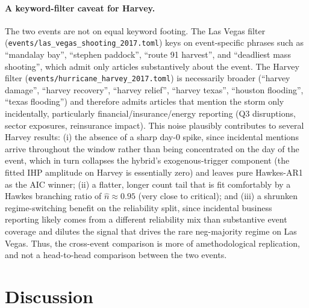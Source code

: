 \documentclass[11pt]{article}
\begin{document}
\paragraph{A keyword-filter caveat for Harvey.}
\sloppy
The two events are not on equal keyword footing. The Las Vegas filter
(\texttt{events/\allowbreak las\_vegas\_\allowbreak shooting\_2017.toml}) keys on event-specific
phrases such as ``mandalay bay'', ``stephen paddock'', ``route 91 harvest'',
and ``deadliest mass shooting'', which admit only articles substantively
about the event. The Harvey filter
(\texttt{events/\allowbreak hurricane\_\allowbreak harvey\_2017.toml}) is necessarily broader
(``harvey damage'', ``harvey recovery'', ``harvey relief'', ``harvey
texas'', ``houston flooding'', ``texas flooding'') and therefore admits
articles that mention the storm only incidentally, particularly
financial/insurance/energy reporting (Q3 disruptions, sector exposures,
reinsurance impact). This noise plausibly contributes to several Harvey
results: (i) the absence of a sharp day-0 spike, since incidental mentions
arrive throughout the window rather than being concentrated on the day of
the event, which in turn collapses the hybrid's exogenous-trigger
component (the fitted IHP amplitude on Harvey is essentially zero) and
leaves pure Hawkes-AR1 as the AIC winner; (ii) a flatter, longer count
tail that is fit comfortably by a Hawkes branching ratio of $\hat n\approx
0.95$ (very close to critical); and (iii) a shrunken regime-switching
benefit on the reliability split, since incidental business reporting
likely comes from a different reliability mix than substantive event
coverage and dilutes the signal that drives the rare neg-majority regime
on Las Vegas. Thus, the cross-event comparison is more of amethodological 
replication, and not a head-to-head comparison between the two events.

\section{Discussion}
\label{sec:discussion}
\end{document}
